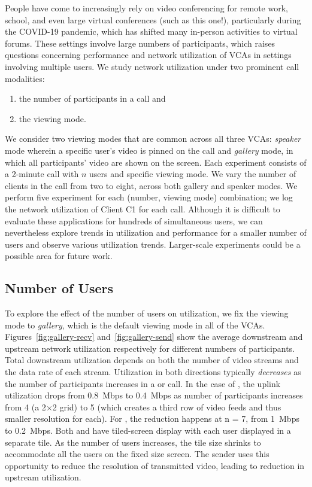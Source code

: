 People have come to increasingly rely on video conferencing for remote work,
school, and even large virtual conferences (such as this one!),
particularly during the COVID-19 pandemic, which has shifted many in-person
activities to virtual forums. These settings involve large numbers of
participants, which raises questions concerning performance and network
utilization of VCAs in settings involving multiple users.
We study network utilization under two prominent call modalities: 
\begin{enumerate}
    \itemsep=-1pt
    \item the
    number of participants in a call and 
\item the viewing mode.
\end{enumerate}
\noindent
We consider two
viewing modes that are common across all three VCAs: \textit{speaker} mode
wherein a specific user's video is pinned on the call and \textit{gallery}
mode, in which all participants' video are shown on the screen.  Each
experiment consists of a 2-minute call with $n$ users and specific viewing
mode. We vary the number of clients in the call from two to eight, across both
gallery and speaker modes.
We perform five experiment for each (number, viewing mode) combination; we log the
network utilization of Client C1 for each call.  Although it is
difficult to evaluate these applications for hundreds of simultaneous users,
we can nevertheless explore trends in utilization and performance for a
smaller number of users and observe various utilization trends. Larger-scale
experiments could be a possible area for future work.


\subsection{Number of Users}

To explore the effect of the number of users on utilization, we fix the
viewing mode to \textit{gallery}, which is the default viewing mode in all of
the VCAs. Figures~\ref{fig:gallery-recv} and~\ref{fig:gallery-send} show the
average downstream and upstream network utilization respectively for different
numbers of participants.  Total downstream utilization depends on both the
number of video streams and the data rate of each stream.  Utilization in both
directions typically {\em decreases} as the number of participants increases
in a \meet or \zoom call. In the case of \zoom, the uplink utilization drops
from 0.8~Mbps to 0.4~Mbps as number of participants increases from 4 (a
2$\times$2 grid) to 5 (which creates a third row of video feeds and thus
smaller resolution for each). For \meet, the reduction happens at n = 7, from
1~Mbps to 0.2~Mbps.  Both \meet and \zoom have tiled-screen display with each
user displayed in a separate tile.  As the number of users increases, the tile
size shrinks to accommodate all the users on the fixed size screen.  The
sender uses this opportunity to reduce the resolution of transmitted video,
leading to reduction in upstream utilization.

